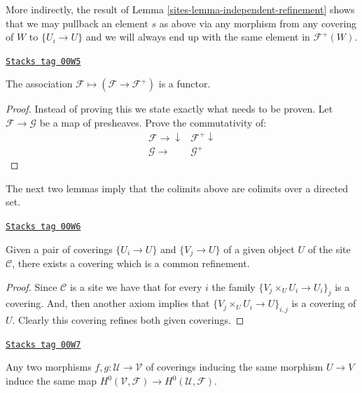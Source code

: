 More indirectly, the result of
Lemma \ref{sites-lemma-independent-refinement} shows that
we may pullback an element $s$ as above via any morphism
from any covering of $W$ to $\{U_i \to U\}$
and we will always end up with the same element in
$\mathcal{F}^+(W)$.

\begin{lemma}
\label{sites-lemma-plus-functorial}
\href{https://stacks.math.columbia.edu/tag/00W5}{\texttt{Stacks tag 00W5}}

The association $\mathcal{F} \mapsto
(\mathcal{F} \to \mathcal{F}^+)$
is a functor.
\end{lemma}

\begin{proof}
Instead of proving this we state exactly what needs to be proven.
Let $\mathcal{F} \to \mathcal{G}$ be a map of presheaves. Prove
the commutativity of:
$$
\begin{array}{cc}\mathcal{F} \longrightarrow\downarrow & \mathcal{F}^{+} \downarrow \\ \mathcal{G} \longrightarrow & \mathcal{G}^{+}\end{array}
$$
\end{proof}

The next two lemmas imply that the colimits above are colimits
over a directed set.

\begin{lemma}
\label{sites-lemma-common-refinement}
\href{https://stacks.math.columbia.edu/tag/00W6}{\texttt{Stacks tag 00W6}}

Given a pair of coverings $\{U_i \to U\}$
and $\{V_j \to U\}$ of a given object $U$ of the site
$\mathcal{C}$, there exists a covering which is a
common refinement.
\end{lemma}

\begin{proof}
Since $\mathcal{C}$ is a site we have that for every $i$ the
family $\{V_j \times_U U_i \to U_i\}_j$ is a covering.
And, then another axiom implies that $\{V_j \times_U U_i \to U\}_{i, j}$
is a covering of $U$. Clearly this covering refines both given
coverings.
\end{proof}

\begin{lemma}
\label{sites-lemma-independent-refinement}
\href{https://stacks.math.columbia.edu/tag/00W7}{\texttt{Stacks tag 00W7}}

Any two morphisms $f, g: \mathcal{U} \to \mathcal{V}$ of coverings
inducing the same morphism $U \to V$ induce the same
map $H^0(\mathcal{V}, \mathcal{F}) \to  H^0(\mathcal{U}, \mathcal{F})$.
\end{lemma}

